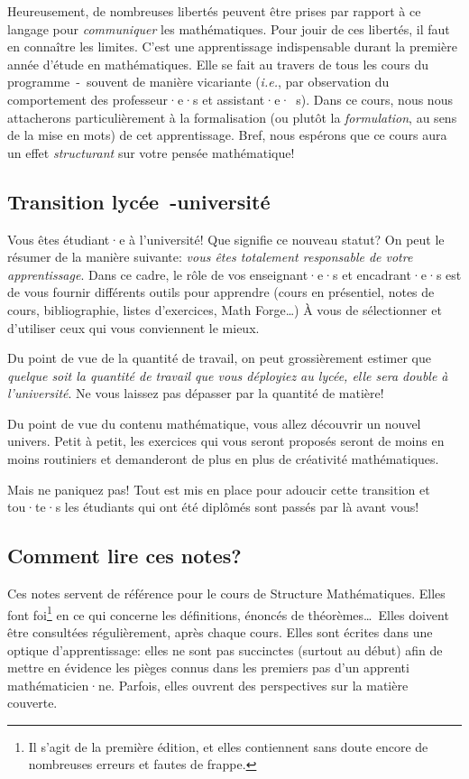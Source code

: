 \documentclass[french,course,oneside,theoremnosection]{lecture}
\begin{document}
Heureusement, de nombreuses libertés peuvent être prises par rapport à ce langage pour \emph{communiquer} les mathématiques. Pour jouir de ces libertés, il faut en connaître les limites. C'est une apprentissage indispensable durant la première année d'étude en mathématiques. Elle se fait au travers de tous les cours du programme~-~souvent de manière vicariante (\emph{i.e.}, par observation du comportement des professeur·e·s et assistant·e·~s). Dans ce cours, nous nous attacherons particulièrement à la formalisation (ou plutôt la \emph{formulation}, au sens de la mise en mots) de cet apprentissage. Bref, nous espérons que ce cours aura un effet \emph{structurant} sur votre pensée mathématique! 

\subsection{Transition lycée~-université}

Vous êtes étudiant·e à l'université! Que signifie ce nouveau statut? On peut le résumer de la manière suivante: \emph{vous êtes totalement responsable de votre apprentissage}. Dans ce cadre, le rôle de vos enseignant·e·s et encadrant·e·s est de vous fournir différents outils pour apprendre (cours en présentiel, notes de cours, bibliographie, listes d'exercices, Math Forge\ldots) À vous de sélectionner et d'utiliser ceux qui vous conviennent le mieux.

Du point de vue de la quantité de travail, on peut grossièrement estimer que  \emph{quelque soit la quantité de travail que vous déployiez au lycée, elle sera double à l'université}. Ne vous laissez pas dépasser par la quantité de matière!

Du point de vue du contenu mathématique, vous allez découvrir un nouvel univers. Petit à petit, les exercices qui vous seront proposés seront de moins en moins routiniers et demanderont de plus en plus de créativité mathématiques.

Mais ne paniquez pas! Tout est mis en place pour adoucir cette transition et tou·te·s les étudiants qui ont été diplômés sont passés par là avant vous!


\subsection{Comment lire ces notes?}
Ces notes servent de référence pour le cours de Structure Mathématiques. Elles font foi\footnote{Il s'agit de la première édition, et elles contiennent sans doute encore de nombreuses erreurs et fautes de frappe.} en ce qui concerne les définitions, énoncés de théorèmes\ldots~Elles doivent être consultées régulièrement, après chaque cours. Elles sont écrites dans une optique d'apprentissage: elles ne sont pas succinctes (surtout au début) afin de mettre en évidence les pièges connus dans les premiers pas d'un apprenti mathématicien·ne. Parfois, elles ouvrent des perspectives sur la matière couverte.
\end{document}
